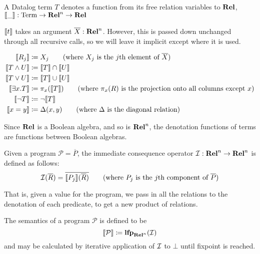 \begin{defn}
  A Datalog term $T$ denotes a function from its free relation variables to
  $\mathbf{Rel}$, $\llbracket \_ \rrbracket : \mathrm{Term} \rightarrow \mathbf{Rel}^n \rightarrow \mathbf{Rel}$

  $\llbracket t \rrbracket$ takes an argument $\overline{X} : \mathbf{Rel}^n$. However, this is
  passed down unchanged through all recursive calls, so we will leave it
  implicit except where it is used.

  \begin{align*}
    \denote{R_j} &\defeq X_j \tag{where $X_j$ is the $j$th element of $\overline{X}$}\\
    \denote{T \wedge U} &\defeq \denote{T} \cap \denote{U}\\
    \denote{T \vee U} &\defeq \denote{T} \cup \denote{U}\\
    \denote{\exists x. T} &\defeq \pi_x(\denote{T}) \tag{where $\pi_x(R)$ is the projection onto all columns except $x$}\\
    \denote{\neg T} &\defeq \neg \denote{T}\\
    \denote{x=y} &\defeq \Delta(x, y) \tag{where $\Delta$ is the diagonal relation}
  \end{align*}
\end{defn}

Since $\mathbf{Rel}$ is a Boolean algebra, and so is $\mathbf{Rel}^n$, the denotation
functions of terms are functions between Boolean algebras.

\begin{defn}
  Given a program $\mathcal{P} = \overline{P}$, the immediate consequence operator $\mathcal{I}: \mathbf{Rel}^n \rightarrow \mathbf{Rel}^n$ is defined as follows:
  \begin{displaymath}
    \consq(\overline{R}) = \overline{\denote{P_j}(\overline{R})} \tag{where $P_j$ is the $j$th component of $\overline{P}$}
  \end{displaymath}
\end{defn}

That is, given a value for the program, we pass in all the relations
to the denotation of each predicate, to get a new product of relations.

\begin{defn}
  The semantics of a program $\mathcal{P}$ is defined to be
  \begin{displaymath}
    \llbracket \mathcal{P} \rrbracket \coloneqq \textbf{lfp}_{\mathbf{Rel}^n}(\mathcal{I})
  \end{displaymath}
  and may be calculated by iterative application of $\mathcal{I}$ to $\bot$ until
  fixpoint is reached.
\end{defn}

